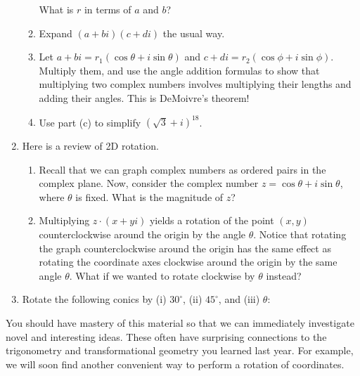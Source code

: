 \documentclass[../textbook.tex]{subfiles}
\begin{document}
\begin{enumerate}
\begin{enumerate}
What is $r$ in terms of $a$ and $b$?
\item Expand $(a+bi)(c+di)$ the usual way.
\item Let $a+bi=r_1(\cos\theta + i\sin\theta)$ and $c+di=r_2(\cos\phi + i\sin\phi)$. Multiply them, and use the angle addition formulas to show that multiplying two complex numbers involves multiplying their lengths and adding their angles. This is DeMoivre's theorem!
\item Use part (c) to simplify $(\sqrt{3}+i)^{18}$.
\end{enumerate}
\item Here is a review of 2D rotation.
\begin{enumerate}
\item Recall that we can graph complex numbers as ordered pairs in the complex plane. Now, consider the complex number $z=\cos \theta + i\sin\theta$, where $\theta$ is fixed. What is the magnitude of $z$?
\item Multiplying $z\cdot(x+yi)$ yields a rotation of the point $(x,y)$ counterclockwise around the origin by the angle $\theta$. Notice that rotating the graph counterclockwise around the origin has the same effect as rotating the coordinate axes clockwise around the origin by the same angle $\theta$. What if we wanted to rotate clockwise by $\theta$ instead?
\end{enumerate}
\item Rotate the following conics by (i) $30^\circ$, (ii) $45^\circ$, and (iii) $\theta$:
\begin{enumerate}
\end{enumerate}
\end{enumerate}

\noindent You should have mastery of this material so that we can immediately investigate novel and interesting ideas. These often have surprising connections to the trigonometry and transformational geometry you learned last year. For example, we will soon find another convenient way to perform a rotation of coordinates.
\end{document}

